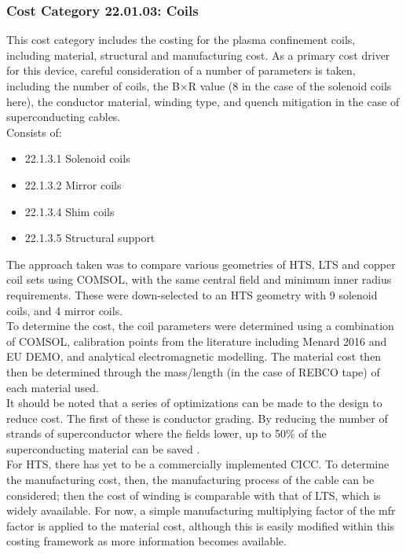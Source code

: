 \subsubsection*{Cost Category 22.01.03: Coils}

This cost category includes the costing for the plasma confinement coils, including  material, structural and manufacturing cost. As a primary cost driver for this device, careful consideration of a number of parameters is taken, including the number of coils, the B$\times$R value (8 in the case of the solenoid coils here), the conductor material, winding type, and quench mitigation in the case of superconducting cables.\\

Consists of:

\begin{itemize}
    \item 22.1.3.1 Solenoid coils
    \item 22.1.3.2 Mirror coils
    \item 22.1.3.4 Shim coils
    \item 22.1.3.5 Structural support
\end{itemize}
   

The approach taken was to compare various geometries of HTS, LTS and copper coil sets using COMSOL, with the same central field and minimum inner radius requirements. These were down-selected to an HTS geometry with 9 solenoid coils, and 4 mirror coils.\\

To determine the cost, the coil parameters were determined using a combination of COMSOL, calibration points from the literature including Menard 2016 \cite{Menard2016} and EU DEMO, and analytical electromagnetic modelling. The material cost then then be determined through the mass/length (in the case of REBCO tape) of each material used.\\

It should be noted that a series of optimizations can be made to the design to reduce cost. The first of these is conductor grading. By reducing the number of strands of superconductor where the fields lower, up to 50\% of the superconducting material can be saved \cite{uglietti2018progressing}.\\

For HTS, there has yet to be a commercially implemented CICC. To determine the manufacturing cost, then, the manufacturing process of the cable can be considered; then the cost of winding is comparable with that of LTS, which is widely avaailable. For now, a simple manufacturing multiplying factor of the mfr factor is applied to the material cost, although this is easily modified within this costing framework as more information becomes available.\\


